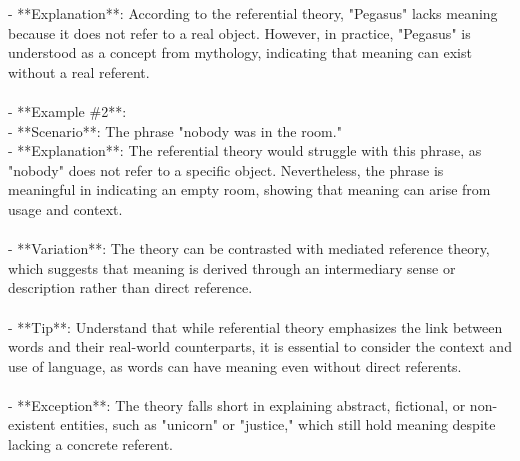 \documentclass[a4paper,12pt,single,pdftex]{scrartcl}
\begin{document}
    
        - **Explanation**: According to the referential theory, "Pegasus" lacks meaning because it does not refer to a real object. However, in practice, "Pegasus" is understood as a concept from mythology, indicating that meaning can exist without a real referent.
    \\

    
      
    \\

    
      - **Example \#2**:
    \\

    
        - **Scenario**: The phrase "nobody was in the room."
    \\

    
        - **Explanation**: The referential theory would struggle with this phrase, as "nobody" does not refer to a specific object. Nevertheless, the phrase is meaningful in indicating an empty room, showing that meaning can arise from usage and context.
    \\

    
      
    \\

    
      - **Variation**: The theory can be contrasted with mediated reference theory, which suggests that meaning is derived through an intermediary sense or description rather than direct reference.
    \\

    
      
    \\

    
      - **Tip**: Understand that while referential theory emphasizes the link between words and their real-world counterparts, it is essential to consider the context and use of language, as words can have meaning even without direct referents.
    \\

    
      
    \\

    
      - **Exception**: The theory falls short in explaining abstract, fictional, or non-existent entities, such as "unicorn" or "justice," which still hold meaning despite lacking a concrete referent.
    \\

    
      
    \\
\end{document}
